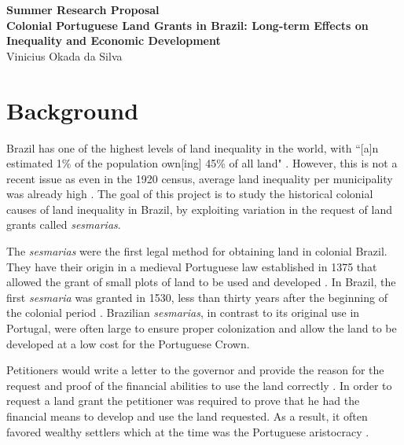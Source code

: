 \documentclass{article}
\begin{document}
\begin{center}
\large \textbf{Summer Research Proposal}
\\
\normalsize \textbf{Colonial Portuguese Land Grants in Brazil: Long-term Effects on Inequality and Economic Development}
\\
\smallskip
\small Vinicius Okada da Silva
\end{center}

\vspace{-10mm}

\section{Background}

Brazil has one of the highest levels of land inequality in the world, with ``[a]n estimated 1\% of the population own[ing] 45\% of all land" \parencite{Usaid2016-xs}. However, this is not a recent issue as even in the 1920 census, average land inequality per municipality was already high \parencite{Wigton-Jones2020-ex}. 
The goal of this project is to study the historical colonial causes of land inequality in Brazil, by exploiting variation in the request of land grants called \textit{sesmarias}.

The \textit{sesmarias} were the first legal method for obtaining land in colonial Brazil.
They have their origin in a medieval Portuguese law established in 1375 that allowed the grant of small plots of land to be used and developed \parencite[p.~16]{Diegues_Junior1959-ba}. 
In Brazil, the first \textit{sesmaria} was granted in 1530, less than thirty years after the beginning of the colonial period \parencite[p.~16]{Diegues_Junior1959-ba}. 
Brazilian \textit{sesmarias}, in contrast to its original use in Portugal, were often large to ensure proper colonization and allow the land to be developed at a low cost for the Portuguese Crown.  

Petitioners would write a letter to the governor and provide the reason for the request and proof of the financial abilities to use the land correctly \parencite{Smith1944-oi}.
In order to request a land grant the petitioner was required to prove that he had the financial means to develop and use the land requested.
As a result, it often favored wealthy settlers which at the time was the Portuguese aristocracy \parencite{Lobb1976-mc}.
\end{document}
